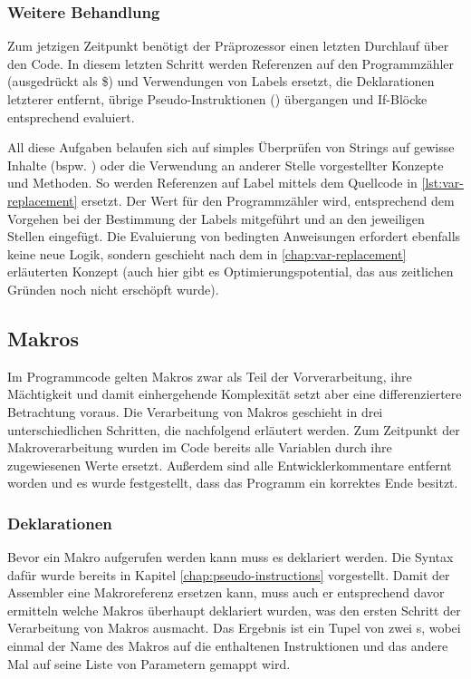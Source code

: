 \subsubsection{Weitere Behandlung}

Zum jetzigen Zeitpunkt benötigt der Präprozessor einen letzten Durchlauf über den Code. In diesem letzten Schritt werden Referenzen auf den Programmzähler (ausgedrückt als \glqq \$\grqq) und Verwendungen von Labels ersetzt, die Deklarationen letzterer entfernt, übrige Pseudo-Instruktionen () übergangen und If-Blöcke entsprechend evaluiert.

All diese Aufgaben belaufen sich auf simples Überprüfen von Strings auf gewisse Inhalte (bspw. ) oder die Verwendung an anderer Stelle vorgestellter Konzepte und Methoden. So werden Referenzen auf Label mittels dem Quellcode in \ref{lst:var-replacement} ersetzt. Der Wert für den Programmzähler wird, entsprechend dem Vorgehen bei der Bestimmung der Labels mitgeführt und an den jeweiligen Stellen eingefügt. Die Evaluierung von bedingten Anweisungen erfordert ebenfalls keine neue Logik, sondern geschieht nach dem in \ref{chap:var-replacement} erläuterten Konzept (auch hier gibt es Optimierungspotential, das aus zeitlichen Gründen noch nicht erschöpft wurde).

\subsection{Makros}\label{chap:macros}

Im Programmcode gelten Makros zwar als Teil der Vorverarbeitung, ihre Mächtigkeit und damit einhergehende Komplexität setzt aber eine differenziertere Betrachtung voraus. Die Verarbeitung von Makros geschieht in drei unterschiedlichen Schritten, die nachfolgend erläutert werden. Zum Zeitpunkt der Makroverarbeitung wurden im Code bereits alle Variablen durch ihre zugewiesenen Werte ersetzt. Außerdem sind alle Entwicklerkommentare entfernt worden und es wurde festgestellt, dass das Programm ein korrektes Ende besitzt.

\subsubsection{Deklarationen}

Bevor ein Makro aufgerufen werden kann muss es deklariert werden. Die Syntax dafür wurde bereits in Kapitel \ref{chap:pseudo-instructions} vorgestellt. Damit der Assembler eine Makroreferenz ersetzen kann, muss auch er entsprechend davor ermitteln welche Makros überhaupt deklariert wurden, was den ersten Schritt der Verarbeitung von Makros ausmacht. Das Ergebnis ist ein Tupel von zwei s, wobei einmal der Name des Makros auf die enthaltenen Instruktionen und das andere Mal auf seine Liste von Parametern gemappt wird.

